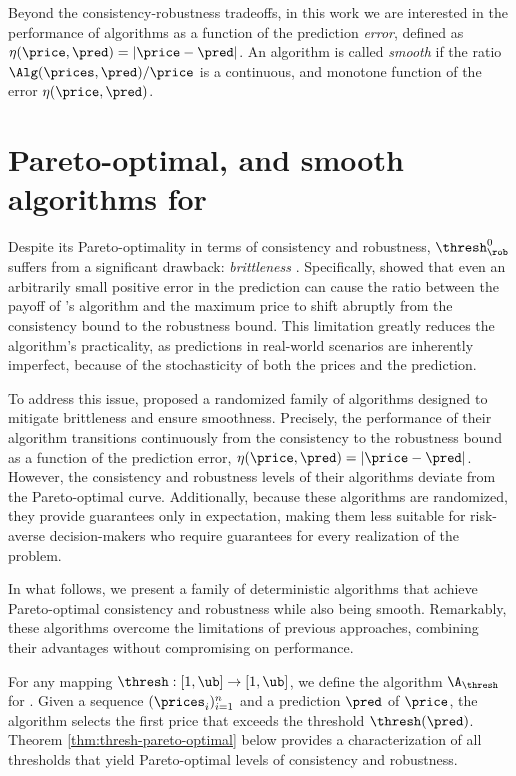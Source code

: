 Beyond the consistency-robustness tradeoffs, in this work we are interested in the performance of algorithms as a function of the prediction {\em error},  defined as $\eta(\price, \pred) = |\price - \pred|$. An algorithm is called {\em smooth} if the ratio 
$\Alg(\prices,\pred)/{\price}$ is a continuous, and monotone function of the error $\eta(\price,\pred)$.




\section{Pareto-optimal, and smooth algorithms for {\OMS{}}}\label{sec: deterministic predictions}



Despite its Pareto-optimality in terms of consistency and robustness, $\thresh^0_\rob$ suffers from a significant drawback: \textit{brittleness} \cite{elenter2024overcoming}. Specifically, \citet{benomar2025tradeoffs} showed that even an arbitrarily small positive error in the prediction can cause the ratio between the payoff of \citet{sun_pareto-optimal_2021}'s algorithm and the maximum price to shift abruptly from the consistency bound to the robustness bound. This limitation greatly reduces the algorithm's practicality, as predictions in real-world scenarios are inherently imperfect, because of the stochasticity of both the prices and the prediction.

To address this issue, \citet{benomar2025tradeoffs} proposed a randomized family of algorithms designed to mitigate brittleness and ensure smoothness. Precisely, the performance of their algorithm transitions continuously from the consistency to the robustness bound as a function of the prediction error, $\eta(\price, \pred) = |\price - \pred|$. However, the consistency and robustness levels of their algorithms deviate from the Pareto-optimal curve. Additionally, because these algorithms are randomized, they provide guarantees only in expectation, making them less suitable for risk-averse decision-makers who require guarantees for every realization of the problem.

In what follows, we present a family of deterministic algorithms that achieve Pareto-optimal consistency and robustness while also being smooth. Remarkably, these algorithms overcome the limitations of previous approaches, combining their advantages without compromising on performance.

For any mapping $\thresh: [1,\ub] \to [1,\ub]$, we define the algorithm $\A_\thresh$ for \OMS{}. Given a sequence $(\prices_i)_{i=1}^n$ and a prediction $\pred$ of $\price$, the algorithm selects the first price that exceeds the threshold $\thresh(\pred)$. 
Theorem \ref{thm:thresh-pareto-optimal} below provides a characterization of all thresholds that yield Pareto-optimal levels of consistency and robustness.

